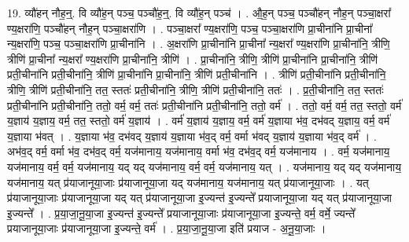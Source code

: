 \documentclass[17pt]{extarticle}
\begin{document}
19. व्यौ॑हन् नौह॒न्॒. वि व्यौ॑ह॒न् पञ्च॒ पञ्चौ॑ह॒न्॒. वि व्यौ॑ह॒न् पञ्च॑ । . औ॒ह॒न् पञ्च॒ पञ्चौ॑हन् नौह॒न् पञ्चा॒क्षरा᳚ ण्य॒क्षरा॑णि॒ पञ्चौ॑हन् नौह॒न् पञ्चा॒क्षरा॑णि । . पञ्चा॒क्षरा᳚ ण्य॒क्षरा॑णि॒ पञ्च॒ पञ्चा॒क्षरा॑णि प्रा॒चीना॑नि प्रा॒चीना᳚ न्य॒क्षरा॑णि॒ पञ्च॒ पञ्चा॒क्षरा॑णि प्रा॒चीना॑नि । . अ॒क्षरा॑णि प्रा॒चीना॑नि प्रा॒चीना᳚ न्य॒क्षरा᳚ ण्य॒क्षरा॑णि प्रा॒चीना॑नि॒ त्रीणि॒ त्रीणि॑ प्रा॒चीना᳚ न्य॒क्षरा᳚ ण्य॒क्षरा॑णि प्रा॒चीना॑नि॒ त्रीणि॑ । . प्रा॒चीना॑नि॒ त्रीणि॒ त्रीणि॑ प्रा॒चीना॑नि प्रा॒चीना॑नि॒ त्रीणि॑ प्रती॒चीना॑नि प्रती॒चीना॑नि॒ त्रीणि॑ प्रा॒चीना॑नि प्रा॒चीना॑नि॒ त्रीणि॑ प्रती॒चीना॑नि । . त्रीणि॑ प्रती॒चीना॑नि प्रती॒चीना॑नि॒ त्रीणि॒ त्रीणि॑ प्रती॒चीना॑नि॒ तत॒ स्ततः॑ प्रती॒चीना॑नि॒ त्रीणि॒ त्रीणि॑ प्रती॒चीना॑नि॒ ततः॑ । . प्र॒ती॒चीना॑नि॒ तत॒ स्ततः॑ प्रती॒चीना॑नि प्रती॒चीना॑नि॒ ततो॒ वर्म॒ वर्म॒ ततः॑ प्रती॒चीना॑नि प्रती॒चीना॑नि॒ ततो॒ वर्म॑ । . ततो॒ वर्म॒ वर्म॒ तत॒ स्ततो॒ वर्म॑ य॒ज्ञाय॑ य॒ज्ञाय॒ वर्म॒ तत॒ स्ततो॒ वर्म॑ य॒ज्ञाय॑ । . वर्म॑ य॒ज्ञाय॑ य॒ज्ञाय॒ वर्म॒ वर्म॑ य॒ज्ञाया भ॑व॒ दभ॑वद् य॒ज्ञाय॒ वर्म॒ वर्म॑ य॒ज्ञाया भ॑वत् । . य॒ज्ञाया भ॑व॒ दभ॑वद् य॒ज्ञाय॑ य॒ज्ञाया भ॑व॒द् वर्म॒ वर्मा भ॑वद् य॒ज्ञाय॑ य॒ज्ञाया भ॑व॒द् वर्म॑ । . अभ॑व॒द् वर्म॒ वर्मा भ॑व॒ दभ॑व॒द् वर्म॒ यज॑मानाय॒ यज॑मानाय॒ वर्मा भ॑व॒ दभ॑व॒द् वर्म॒ यज॑मानाय । . वर्म॒ यज॑मानाय॒ यज॑मानाय॒ वर्म॒ वर्म॒ यज॑मानाय॒ यद् यद् यज॑मानाय॒ वर्म॒ वर्म॒ यज॑मानाय॒ यत् । . यज॑मानाय॒ यद् यद् यज॑मानाय॒ यज॑मानाय॒ यत् प्र॑याजानूया॒जाः प्र॑याजानूया॒जा यद् यज॑मानाय॒ यज॑मानाय॒ यत् प्र॑याजानूया॒जाः । . यत् प्र॑याजानूया॒जाः प्र॑याजानूया॒जा यद् यत् प्र॑याजानूया॒जा इ॒ज्यन्त॑ इ॒ज्यन्ते᳚ प्रयाजानूया॒जा यद् यत् प्र॑याजानूया॒जा इ॒ज्यन्ते᳚ । . प्र॒या॒जा॒नू॒या॒जा इ॒ज्यन्त॑ इ॒ज्यन्ते᳚ प्रयाजानूया॒जाः प्र॑याजानूया॒जा इ॒ज्यन्ते॒ वर्म॒ वर्मे॒ ज्यन्ते᳚ प्रयाजानूया॒जाः प्र॑याजानूया॒जा इ॒ज्यन्ते॒ वर्म॑ । . प्र॒या॒जा॒नू॒या॒जा इति॑ प्रयाज - अ॒नू॒या॒जाः । \newline
\end{document}
